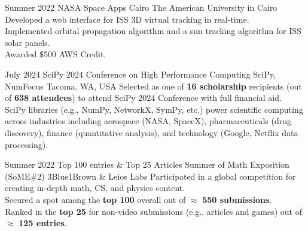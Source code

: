 \documentclass[]{report}
\begin{document}
\entry 
    {Summer 2022}
    {NASA Space Apps Cairo}
    {The American University in Cairo }{}
    { 
        \tb Developed a web interface for ISS 3D virtual tracking in real-time. \\
        \tb Implemented orbital propagation algorithm and a sun tracking algorithm for ISS solar panels.\\
        \tb Awarded \$500 AWS Credit.
    }


\entry
    {July 2024}
    {SciPy 2024 Conference on High Performance Computing}  
    {SciPy, NumFocus}
    {Tacoma, WA, USA}
    {
        \tb Selected as one of \textbf{16 scholarship} recipients (out of \textbf{638 attendees}) to attend SciPy 2024 Conference with full financial aid.\\
        \tb SciPy libraries (e.g., NumPy, NetworkX, SymPy, etc.) power scientific computing across industries including aerospace (NASA, SpaceX), pharmaceuticals (drug discovery), finance (quantitative analysis), and technology (Google, Netflix data processing).
    }

\entry
    {Summer 2022}
    {Top 100 entries \& Top 25 Articles}
    {Summer of Math Exposition (SoME\#2)}
    {3Blue1Brown \& Leios Labs}  
    {
        \tb Participated in a global competition for creating in-depth math, CS, and physics content.\\
        \tb Secured a spot among the \textbf{top 100} overall out of $\approx$ \textbf{550 submissions}.\\
        \tb Ranked in the \textbf{top 25} for non-video submissions (e.g., articles and games) out of $\approx$ \textbf{125 entries}.
    }


\end{document}
